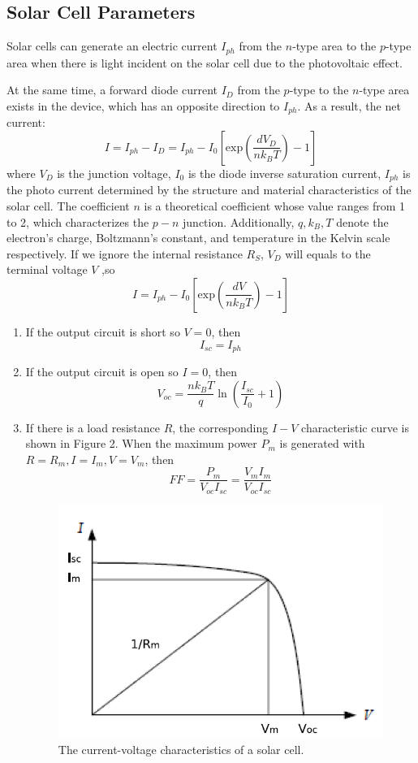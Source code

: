 \documentclass[12pt]{article}
\begin{document}
\subsection{Solar Cell Parameters}
Solar cells can generate an electric current $I_{ph}$ from the $n$-type area to the $p$-type area when there is light incident on the solar cell due to the photovoltaic effect.
\par At the same time, a forward diode current $I_D$ from  the $p$-type to the $n$-type area  exists in the device, which has an opposite direction to $I_{ph}$. As a result, the net current:
\begin{equation}
I=I_{ph}-I_D=I_{ph}-I_0[\mathrm{exp}(\frac{dV_D}{nk_BT})-1]
\end{equation}	
where $V_D$ is the junction voltage, $I_0$ is the diode inverse saturation current, $I_{ph}$ is the photo current determined by the structure and material characteristics of the solar cell. The coefficient $n$ is a theoretical coefficient whose value ranges from 1 to 2, which characterizes the $p-n$ junction. Additionally, $q,k_B,T$ denote the electron's charge, Boltzmann's constant, and temperature in the Kelvin scale respectively. If we ignore the internal resistance $R_S$, $V_D$ will equals to the terminal voltage $V$ ,so 
$$I=I_{ph}-I_0[\mathrm{exp}(\frac{dV}{nk_BT})-1]$$
\begin{enumerate}
\item If the output circuit is short so $V=0$, then 
$$I_{sc}=I_{ph}$$
\item If the output circuit is open so $I=0$, then
$$V_{oc}=\frac{nk_BT}{q}\ln(\frac{I_{sc}}{I_0}+1)$$
\item If there is a load resistance $R$, the corresponding $I-V$ characteristic curve is shown in Figure 2. When the maximum power $P_m$ is generated with $R=R_m,I=I_m,V=V_m$, then 
$$FF=\frac{P_m}{V_{oc}I_{sc}}=\frac{V_mI_m}{V_{oc}I_{sc}}$$
\begin{figure}[H]
\centering
\includegraphics[scale=0.7]{P2.jpg}
\caption{The current-voltage characteristics of a solar cell.}
\end{figure}
\end{enumerate}
\end{document}
